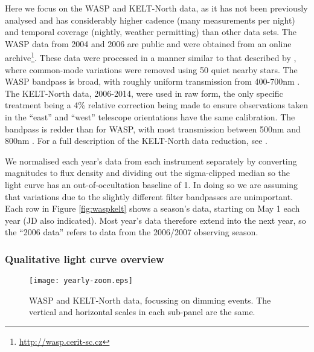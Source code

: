 \documentclass[]{rsos}
\begin{document}
Here we focus on the WASP and KELT-North data, as it has not been previously analysed and
has considerably higher cadence (many measurements per night) and temporal coverage
(nightly, weather permitting) than other data sets. The WASP data from 2004 and 2006 are
public and were obtained from an online
archive\footnote{\href{http://wasp.cerit-sc.cz}{http://wasp.cerit-sc.cz}}. These data
were processed in a manner similar to that described by \cite{2014MNRAS.441.2845V}, where
common-mode variations were removed using 50 quiet nearby stars. The WASP bandpass is
broad, with roughly uniform transmission from 400-700nm \cite{2006PASP..118.1407P}. The
KELT-North data, 2006-2014, were used in raw form, the only specific treatment being a
4\% relative correction being made to ensure observations taken in the ``east'' and
``west'' telescope orientations have the same calibration. The bandpass is redder than
for WASP, with most transmission between 500nm and 800nm \cite{2007PASP..119..923P}.  For
a full description of the KELT-North data reduction, see \cite{2012ApJ...761..123S}.

We normalised each year's data from each instrument separately by converting magnitudes
to flux density and dividing out the sigma-clipped median so the light curve has an
out-of-occultation baseline of 1. In doing so we are assuming that variations due to the
slightly different filter bandpasses are unimportant. Each row in Figure
\ref{fig:waspkelt} shows a season's data, starting on May 1 each year (JD also
indicated). Most year's data therefore extend into the next year, so the ``2006 data''
refers to data from the 2006/2007 observing season.

\subsubsection{Qualitative light curve overview}\label{sss:quallc}

\begin{figure*}
  \begin{center}
    \hspace{-0.5cm} \texttt{[image: yearly-zoom.eps]}
    \caption{WASP and KELT-North data, focussing on dimming events. The vertical and
      horizontal scales in each sub-panel are the same.}\label{fig:waspkeltzoom}
  \end{center}
\end{figure*}
\end{document}
